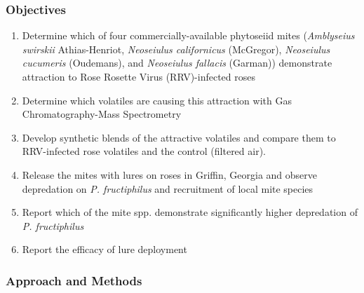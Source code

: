 \documentclass[12pt,final,CPage]{ufthesis}
\begin{document}
{  \hypertarget{objectives}{%
  \subsubsection{Objectives}\label{objectives}}
  \begin{enumerate}
  \def\labelenumi{\arabic{enumi}.}
  \tightlist
  \item
    Determine which of four commercially-available phytoseiid mites (\emph{Amblyseius swirskii} Athias-Henriot, \emph{Neoseiulus californicus} (McGregor), \emph{Neoseiulus cucumeris} (Oudemans), and \emph{Neoseiulus fallacis} (Garman)) demonstrate attraction to Rose Rosette Virus (RRV)-infected roses
  \item
    Determine which volatiles are causing this attraction with Gas Chromatography-Mass Spectrometry
  \item
    Develop synthetic blends of the attractive volatiles and compare them to RRV-infected rose volatiles and the control (filtered air).
  \item
    Release the mites with lures on roses in Griffin, Georgia and observe depredation on \emph{P. fructiphilus} and recruitment of local mite species
  \item
    Report which of the mite spp. demonstrate significantly higher depredation of \emph{P. fructiphilus}
  \item
    Report the efficacy of lure deployment
  \end{enumerate}
  \hypertarget{approach-and-methods}{%
  \subsubsection{Approach and Methods}\label{approach-and-methods}}

}
\end{document}
